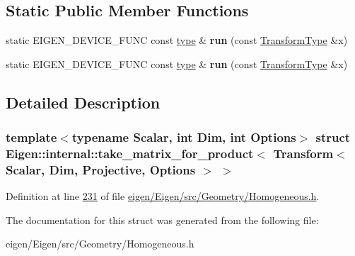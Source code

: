 \subsection*{Static Public Member Functions}
\begin{DoxyCompactItemize}
\item 
\mbox{\label{struct_eigen_1_1internal_1_1take__matrix__for__product_3_01_transform_3_01_scalar_00_01_dim_00_0edf36e01556babc5f053852863696371_a5765f43d28e405572a1658470f8fee86}} 
static E\+I\+G\+E\+N\+\_\+\+D\+E\+V\+I\+C\+E\+\_\+\+F\+U\+NC const \hyperlink{group___core___module_class_eigen_1_1_matrix}{type} \& {\bfseries run} (const \hyperlink{group___geometry___module_class_eigen_1_1_transform}{Transform\+Type} \&x)
\item 
\mbox{\label{struct_eigen_1_1internal_1_1take__matrix__for__product_3_01_transform_3_01_scalar_00_01_dim_00_0edf36e01556babc5f053852863696371_a5765f43d28e405572a1658470f8fee86}} 
static E\+I\+G\+E\+N\+\_\+\+D\+E\+V\+I\+C\+E\+\_\+\+F\+U\+NC const \hyperlink{group___core___module_class_eigen_1_1_matrix}{type} \& {\bfseries run} (const \hyperlink{group___geometry___module_class_eigen_1_1_transform}{Transform\+Type} \&x)
\end{DoxyCompactItemize}


\subsection{Detailed Description}
\subsubsection*{template$<$typename Scalar, int Dim, int Options$>$\newline
struct Eigen\+::internal\+::take\+\_\+matrix\+\_\+for\+\_\+product$<$ Transform$<$ Scalar, Dim, Projective, Options $>$ $>$}



Definition at line \hyperlink{eigen_2_eigen_2src_2_geometry_2_homogeneous_8h_source_l00231}{231} of file \hyperlink{eigen_2_eigen_2src_2_geometry_2_homogeneous_8h_source}{eigen/\+Eigen/src/\+Geometry/\+Homogeneous.\+h}.



The documentation for this struct was generated from the following file\+:\begin{DoxyCompactItemize}
\item 
eigen/\+Eigen/src/\+Geometry/\+Homogeneous.\+h\end{DoxyCompactItemize}
